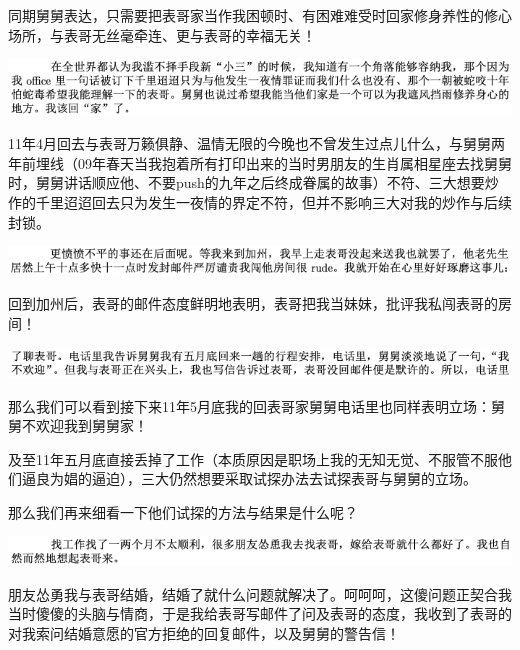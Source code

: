 \documentclass[9pt, b5paper]{article}
\begin{document}
同期舅舅表达，只需要把表哥家当作我困顿时、有困难难受时回家修身养性的修心场所，与表哥无丝毫牵连、更与表哥的幸福无关！

\begin{center}
\includegraphics[width=.9\linewidth]{./pic/backups_plans_20210412_171721.png}
\end{center}

11年4月回去与表哥万籁俱静、温情无限的今晚也不曾发生过点儿什么，与舅舅两年前埋线（09年春天当我抱着所有打印出来的当时男朋友的生肖属相星座去找舅舅时，舅舅讲话顺应他、不要push的九年之后终成眷属的故事）不符、三大想要炒作的千里迢迢回去只为发生一夜情的界定不符，但并不影响三大对我的炒作与后续封锁。

\begin{center}
\includegraphics[width=.9\linewidth]{./pic/backups_plans_20210412_171817.png}
\end{center}

回到加州后，表哥的邮件态度鲜明地表明，表哥把我当妹妹，批评我私闯表哥的房间！

\begin{center}
\includegraphics[width=.9\linewidth]{./pic/backups_plans_20210412_171851.png}
\end{center}

那么我们可以看到接下来11年5月底我的回表哥家舅舅电话里也同样表明立场：舅舅不欢迎我到舅舅家！

及至11年五月底直接丢掉了工作（本质原因是职场上我的无知无觉、不服管不服他们逼良为娼的逼迫），三大仍然想要采取试探办法去试探表哥与舅舅的立场。

那么我们再来细看一下他们试探的方法与结果是什么呢？

\begin{center}
\includegraphics[width=.9\linewidth]{./pic/backups_plans_20210412_172222.png}
\end{center}

朋友怂勇我与表哥结婚，结婚了就什么问题就解决了。呵呵呵，这傻问题正契合我当时傻傻的头脑与情商，于是我给表哥写邮件了问及表哥的态度，我收到了表哥的对我索问结婚意愿的官方拒绝的回复邮件，以及舅舅的警告信！
\end{document}
